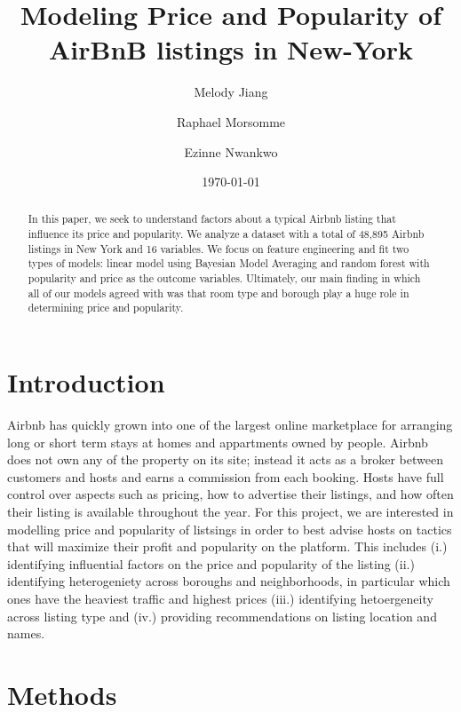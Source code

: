 \documentclass[10pt]{jmlr}%
\title[Modeling Price and Popularity of AirBnB listings in New-York]{Modeling Price and Popularity of AirBnB listings in New-York}	%
\author[Jiang, Morsomme, Nwankwo]{Melody Jiang \and Raphael Morsomme \and Ezinne Nwankwo}
\date{\today} %
\begin{document}
\maketitle

\begin{abstract}
In this paper, we seek to understand factors about a typical Airbnb listing that influence its price and popularity. We analyze a dataset with a total of 48,895 Airbnb listings in New York and 16 variables. We focus on feature engineering and fit two types of models: linear model using Bayesian Model Averaging and random forest with popularity and price as the outcome variables. Ultimately, our main finding in which all of our models agreed with was that room type and borough play a huge role in determining price and popularity. 
\end{abstract}

\section{Introduction}
\label{sec:intro}

Airbnb has quickly grown into one of the largest online marketplace for arranging long or short term stays at homes and appartments owned by people. Airbnb does not own any of the property on its site; instead it acts as a broker between customers and hosts and earns a commission from each booking. Hosts have full control over aspects such as pricing, how to advertise their listings, and how often their listing is available throughout the year. For this project, we are interested in modelling price and popularity of listsings in order to best advise hosts on tactics that will maximize their profit and popularity on the platform. This includes (i.) identifying influential factors on the price and popularity of the listing (ii.) identifying heterogeniety across boroughs and neighborhoods, in particular which ones have the heaviest traffic and highest prices (iii.) identifying hetoergeneity across listing type and (iv.) providing recommendations on listing location and names. 


\section{Methods}
\label{sec:method}
\end{document}
